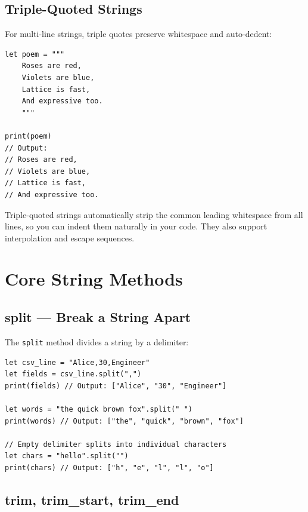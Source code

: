 \subsection{Triple-Quoted Strings}\label{sec:triple-quoted}

For multi-line strings, triple quotes preserve whitespace and auto-dedent:

\begin{lstlisting}[language=Lattice, caption={Triple-quoted strings}]
let poem = """
    Roses are red,
    Violets are blue,
    Lattice is fast,
    And expressive too.
    """

print(poem)
// Output:
// Roses are red,
// Violets are blue,
// Lattice is fast,
// And expressive too.
\end{lstlisting}

Triple-quoted strings automatically strip the common leading whitespace from all lines, so you can indent them naturally in your code. They also support interpolation and escape sequences.

\section{Core String Methods}\label{sec:core-string-methods}

\subsection{split --- Break a String Apart}\label{sec:split}

The \lstinline|split| method divides a string by a delimiter:

\begin{lstlisting}[language=Lattice, caption={Splitting strings}]
let csv_line = "Alice,30,Engineer"
let fields = csv_line.split(",")
print(fields) // Output: ["Alice", "30", "Engineer"]

let words = "the quick brown fox".split(" ")
print(words) // Output: ["the", "quick", "brown", "fox"]

// Empty delimiter splits into individual characters
let chars = "hello".split("")
print(chars) // Output: ["h", "e", "l", "l", "o"]
\end{lstlisting}

\subsection{trim, trim\_start, trim\_end}\label{sec:trim}

